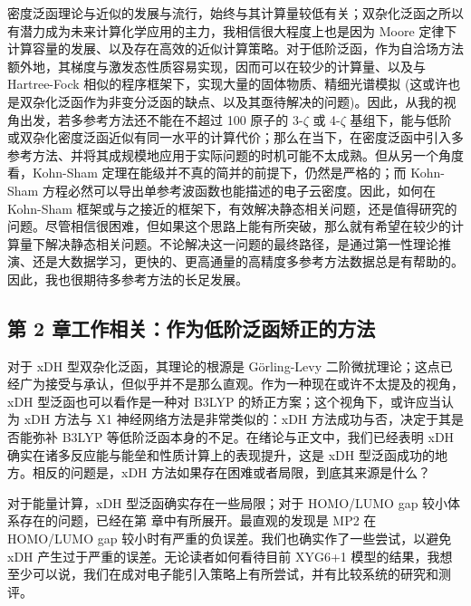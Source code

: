 密度泛函理论与近似的发展与流行，始终与其计算量较低有关；双杂化泛函之所以有潜力成为未来计算化学应用的主力，我相信很大程度上也是因为 Moore 定律下计算容量的发展、以及存在高效的近似计算策略\cite{Almloef-Almloef.CPL.1991, Weigend-Ahlrichs.CPL.1998, Hohenstein-Martinez.JCP.2012, Parrish-Sherrill.JCP.2012}。对于低阶泛函，作为自洽场方法额外地，其梯度与激发态性质容易实现，因而可以在较少的计算量、以及与 Hartree-Fock 相似的程序框架下，实现大量的固体物质、精细光谱模拟 (这或许也是双杂化泛函作为非变分泛函的缺点、以及其亟待解决的问题)。因此，从我的视角出发，若多参考方法还不能在不超过 100 原子的 3-$\zeta$ 或 4-$\zeta$ 基组下，能与低阶或双杂化密度泛函近似有同一水平的计算代价；那么在当下，在密度泛函中引入多参考方法、并将其成规模地应用于实际问题的时机可能不太成熟。但从另一个角度看，Kohn-Sham 定理在能级并不真的简并的前提下，仍然是严格的；而 Kohn-Sham 方程必然可以导出单参考波函数也能描述的电子云密度。因此，如何在 Kohn-Sham 框架或与之接近的框架下，有效解决静态相关问题，还是值得研究的问题。尽管相信很困难，但如果这个思路上能有所突破，那么就有希望在较少的计算量下解决静态相关问题。不论解决这一问题的最终路径，是通过第一性理论推演、还是大数据学习，更快的、更高通量的高精度多参考方法数据总是有帮助的。因此，我也很期待多参考方法的长足发展。

\subsection*{第 2 章工作相关：作为低阶泛函矫正的方法}

对于 xDH 型双杂化泛函，其理论的根源是 G{\"o}rling-Levy 二阶微扰理论；这点已经广为接受与承认，但似乎并不是那么直观。作为一种现在或许不太提及的视角\cite{Zhang-Xu.CC.2010}，xDH 型泛函也可以看作是一种对 B3LYP 的矫正方案；这个视角下，或许应当认为 xDH 方法与 X1 神经网络方法\cite{Wu-Xu.JCP.2007}是非常类似的：xDH 方法成功与否，决定于其是否能弥补 B3LYP 等低阶泛函本身的不足。在绪论与正文中，我们已经表明 xDH 确实在诸多反应能与能垒和性质计算上的表现提升，这是 xDH 型泛函成功的地方。相反的问题是，xDH 方法如果存在困难或者局限，到底其来源是什么？

对于能量计算，xDH 型泛函确实存在一些局限；对于 HOMO/LUMO gap 较小体系存在的问题，已经在第  章中有所展开。最直观的发现是 MP2 在 HOMO/LUMO gap 较小时有严重的负误差。我们也确实作了一些尝试，以避免 xDH 产生过于严重的误差。无论读者如何看待目前 XYG6+1 模型的结果，我想至少可以说，我们在成对电子能引入策略上有所尝试，并有比较系统的研究和测评。

